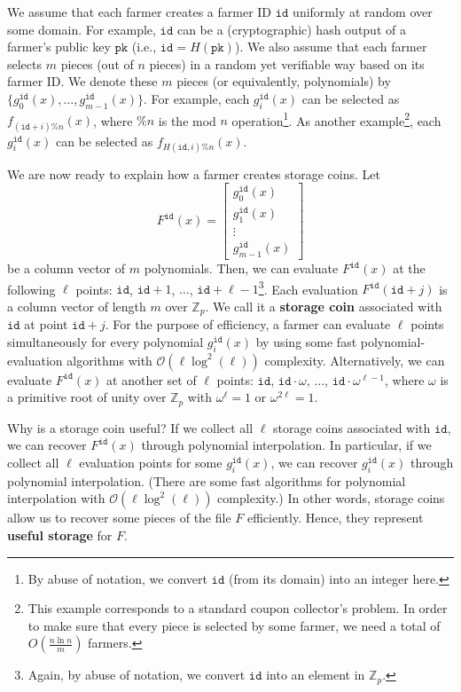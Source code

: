 \documentclass[12pt,draftcls,onecolumn]{IEEEtran}
\newcommand{\Fp}{\mathbb{Z}_p}
\newcommand{\pk}{\texttt{pk}}
\newcommand{\id}{\texttt{id}}
\begin{document}
We assume that each farmer creates a farmer ID $\id$ uniformly at random over some domain. For example, $\id$ can be a (cryptographic) hash output of a farmer's public key $\pk$ (i.e., $\id = H(\pk)$).
We also assume that each farmer selects $m$ pieces (out of $n$ pieces) in a random yet verifiable way based on its farmer ID.
We denote these $m$ pieces (or equivalently, polynomials) by $\{g_0^{\id}(x), \ldots, g_{m-1}^{\id}(x) \}$.
For example, each $g_i^{\id}(x)$ can be selected as $f_{(\id + i)\% n}(x)$, where $\% n$ is the mod $n$ operation\footnote{By abuse of notation, we convert $\id$ (from its domain) into an integer here.}.
As another example\footnote{This example corresponds to a standard coupon collector's problem. In order to make sure that every piece is selected by some farmer, we need a total of $O\left( \frac{n \ln n}{m} \right)$ farmers.}, each $g_i^{\id}(x)$ can be selected as $f_{H(\id, i)\% n}(x)$.

We are now ready to explain how a farmer creates storage coins. Let
\[
F^{\id}(x) = \begin{bmatrix} g_0^{\id}(x)\\ g_1^{\id}(x)\\  \vdots \\ g_{m-1}^{\id}(x) \end{bmatrix}
\]
be a column vector of $m$ polynomials. 
Then, we can evaluate $F^{\id}(x)$ at the following $\ell$ points: $\id$, $\id + 1$, $\ldots$, $\id + \ell - 1$\footnote{Again, by abuse of notation, we convert $\id$ into an element in $\Fp$.}.
Each evaluation $F^{\id}(\id + j)$ is a column vector of length $m$ over $\Fp$. We  call it a {\bf storage coin}
associated with $\id$ at point $\id + j$.
For the purpose of efficiency, a farmer can evaluate $\ell$ points simultaneously for every polynomial $g_i^{\id}(x)$
by using some fast polynomial-evaluation algorithms with $\mathcal{O}(\ell \log^2(\ell))$ complexity.
Alternatively, we can evaluate $F^{\id}(x)$ at another set of $\ell$ points: $\id$, $\id \cdot \omega$, $\ldots$, $\id \cdot \omega^{\ell - 1}$, where $\omega$ is a primitive root of unity over $\Fp$ with $\omega^\ell = 1$ or $\omega^{2 \ell} = 1$.


Why is a storage coin useful? If we collect all $\ell$ storage coins associated with $\id$, we can recover $F^{\id}(x)$ through polynomial interpolation.
In particular, if we collect all $\ell$ evaluation points for some $g_i^{\id}(x)$, we can recover $g_i^{\id}(x)$ through polynomial interpolation.
(There are some fast algorithms for polynomial interpolation with $\mathcal{O}(\ell \log^2(\ell))$ complexity.)
In other words, storage coins allow us to recover some pieces of the file $F$ efficiently. Hence, they represent {\bf useful storage} for $F$.
\end{document}
